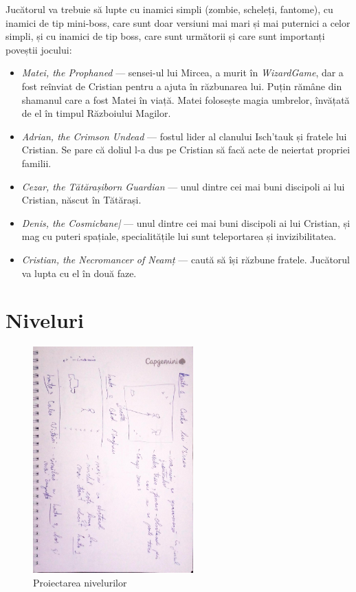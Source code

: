 \documentclass{article}
\begin{document}
    Jucătorul va trebuie să lupte cu inamici simpli (zombie, scheleți, fantome), cu inamici de tip
    mini-boss, care sunt doar versiuni mai mari și mai puternici a celor simpli, și cu inamici de
    tip boss, care sunt următorii și care sunt importanți poveștii jocului:
    \begin{itemize}
        \item \emph{Matei, the Prophaned} --- sensei-ul lui Mircea, a murit în \emph{WizardGame}, dar a
        fost reînviat de Cristian pentru a ajuta în răzbunarea lui. Puțin rămâne din shamanul care
        a fost Matei în viață. Matei folosește magia umbrelor, învățată de el în timpul Războiului Magilor.
        \item \emph{Adrian, the Crimson Undead} --- fostul lider al clanului Isch'tauk și fratele
        lui Cristian. Se pare că doliul l-a dus pe Cristian să facă acte de neiertat propriei familii.
        \item \emph{Cezar, the Tătărașiborn Guardian} --- unul dintre cei mai buni discipoli ai lui
        Cristian, născut în Tătărași.
        \item \emph{Denis, the Cosmicbane|} --- unul dintre cei mai buni discipoli ai lui Cristian, și
        mag cu puteri spațiale, specialitățile lui sunt teleportarea și invizibilitatea.
        \item \emph{Cristian, the Necromancer of Neamț} --- caută să își răzbune fratele. Jucătorul va
        lupta cu el în două faze.
    \end{itemize}


    \section{Niveluri}

    \begin{figure}[h]
        \includegraphics[width=0.55\textwidth, angle=90]{designing-levels}
        \centering
        \caption{Proiectarea nivelurilor}
    \end{figure}
\end{document}
